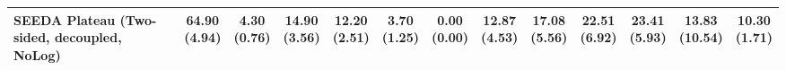 \begin{table}[H]
{\begin{tabular}{l|cccccc|cccccc}
SEEDA Plateau (Two-sided, decoupled, NoLog) & \bfseries \makecell{64.90 \\ (4.94)} & \makecell{4.30 \\ (0.76)} & {\cellcolor[HTML]{C8E6C9}} \makecell{14.90 \\ (3.56)} & \makecell{12.20 \\ (2.51)} & \makecell{3.70 \\ (1.25)} & \makecell{0.00 \\ (0.00)} & \makecell{12.87 \\ (4.53)} & \makecell{17.08 \\ (5.56)} & {\cellcolor[HTML]{C8E6C9}} \makecell{22.51 \\ (6.92)} & \bfseries \makecell{23.41 \\ (5.93)} & \makecell{13.83 \\ (10.54)} & \makecell{10.30 \\ (1.71)} \\
\bottomrule
\end{tabular}
}%
\end{table}
